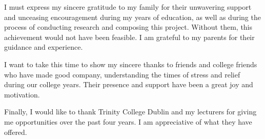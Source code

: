 \documentclass[a4paper,oneside,12pt]{book}
\numberwithin{equation}{chapter} %
\begin{document}
I must express my sincere gratitude to my family for their unwavering support and unceasing encouragement during my years of education, as well as during the process of conducting research and composing this project. Without them, this achievement would not have been feasible. I am grateful to my parents for their guidance and experience.

I want to take this time to show my sincere thanks to friends and college friends who have made good company, understanding the times of stress and relief during our college years. Their presence and support have been a great joy and motivation.

Finally, I would like to thank Trinity College Dublin and my lecturers for giving me opportunities over the past four years.
I am appreciative of what they have offered.




\tableofcontents
\listoffigures
\listoftables
\newpage



\mainmatter









%
\nocite{*}


\appendix
\renewcommand{\thechapter}{A\arabic{chapter}}

\end{document}
